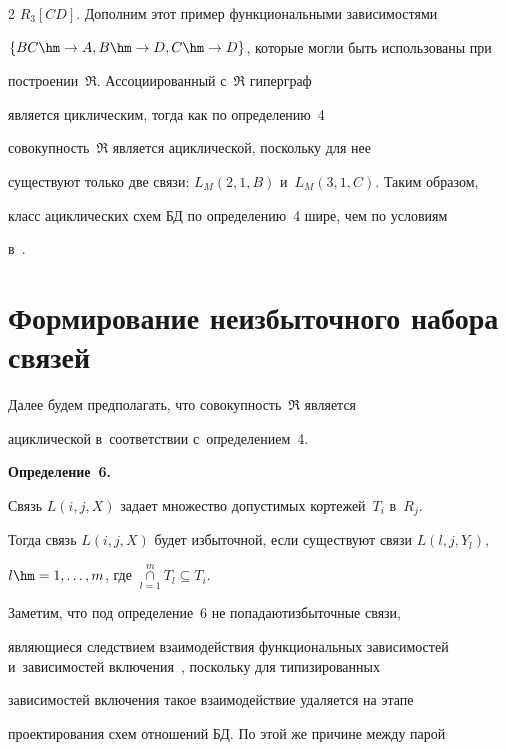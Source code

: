 \begin{multicols}{2}
$R_3[CD]$. Дополним этот пример функциональными зависимостями

$\{BC\hm\to A, B\hm\to D, C\hm\to D\}$, которые могли быть использованы при

построении~$\mathfrak{R}$. Ассоциированный с~$\mathfrak{R}$ гиперграф

является циклическим, тогда как по определению~4

совокупность~$\mathfrak{R}$ является ациклической, поскольку для нее

существуют только две связи: $L_M(2,1,B)$ и~$L_M(3,1,C)$. Таким образом,

класс ациклических схем БД по определению~4 шире, чем по условиям

в~\cite{9-z}.



\section{Формирование неизбыточного набора связей}



  Далее будем предполагать, что совокупность~$\mathfrak{R}$ является

ациклической в~соответствии с~определением~4.



  \smallskip



  \noindent

  \textbf{Определение~6.}

  Связь $L(i,j,X)$ задает множество допустимых кортежей~$T_i$ в~$R_j$.

Тогда связь $L(i,j,X)$ будет избыточной, если существуют связи $L(l,j,Y_l)$,

$l\hm= 1,\ldots ,m$, где $\mathop{\cap}\limits_{l=1}^m T_l\subseteq T_i$.



  \smallskip



  Заметим, что под определение~6 не попадают\linebreak избыточ\-ные связи,

являющиеся следствием взаимо\-действия функциональных зависимостей и~зависимостей включения~\cite{5-z, 7-z}, поскольку для типизированных

зависимостей включения такое взаимодействие удаляется на этапе

проектирования схем отношений БД. По этой же причине между парой


\end{multicols}

